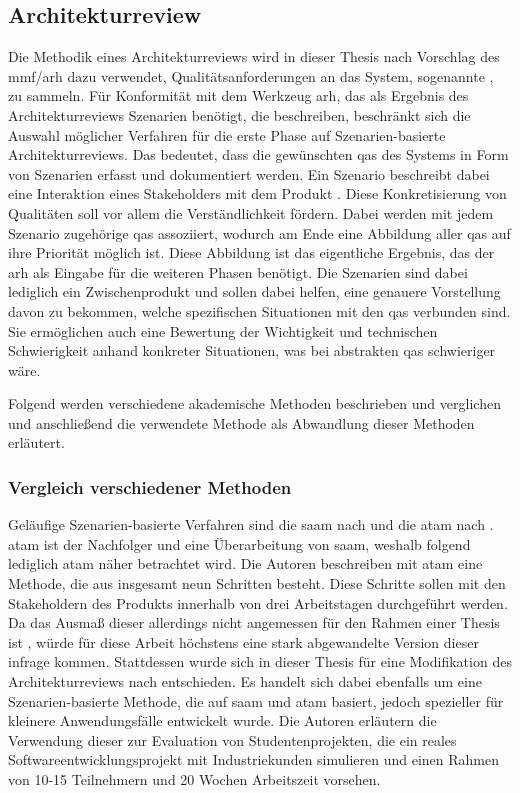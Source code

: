 \subsection{Architekturreview}
\label{sec:methodik-architekturreview}

Die Methodik eines Architekturreviews wird in dieser Thesis nach Vorschlag des \gls{mmf}/\gls{arh} dazu verwendet, Qualitätsanforderungen an das System, sogenannte , zu sammeln.
Für Konformität mit dem Werkzeug \gls{arh}, das als Ergebnis des Architekturreviews Szenarien benötigt, die  beschreiben, beschränkt sich die Auswahl möglicher Verfahren für die erste Phase auf Szenarien-basierte Architekturreviews.
Das bedeutet, dass die gewünschten \glspl{qa} des Systems in Form von Szenarien erfasst und dokumentiert werden.
Ein Szenario beschreibt dabei eine Interaktion eines Stakeholders mit dem Produkt \cite{kazman_2000}.
Diese Konkretisierung von Qualitäten soll vor allem die Verständlichkeit fördern.
Dabei werden mit jedem Szenario zugehörige \glspl{qa} assoziiert, wodurch am Ende eine Abbildung aller \glspl{qa} auf ihre Priorität möglich ist.
Diese Abbildung ist das eigentliche Ergebnis, das der \gls{arh} als Eingabe für die weiteren Phasen benötigt.
Die Szenarien sind dabei lediglich ein Zwischenprodukt und sollen dabei helfen, eine genauere Vorstellung davon zu bekommen, welche spezifischen Situationen mit den \glspl{qa} verbunden sind.
Sie ermöglichen auch eine Bewertung der Wichtigkeit und technischen Schwierigkeit anhand konkreter Situationen, was bei abstrakten \glspl{qa} schwieriger wäre.

Folgend werden verschiedene akademische Methoden beschrieben und verglichen und anschließend die verwendete Methode als Abwandlung dieser Methoden erläutert.

\subsubsection{Vergleich verschiedener Methoden}
\label{sec:atam-saam-svahnberg}

Geläufige Szenarien-basierte Verfahren sind die \gls{saam} nach  und die \gls{atam} nach .
\gls{atam} ist der Nachfolger und eine Überarbeitung von \gls{saam}, weshalb folgend lediglich \gls{atam} näher betrachtet wird.
Die Autoren beschreiben mit \gls{atam} eine Methode, die aus insgesamt neun Schritten besteht.
Diese Schritte sollen mit den Stakeholdern des Produkts innerhalb von drei Arbeitstagen durchgeführt werden.
Da das Ausmaß dieser allerdings nicht angemessen für den Rahmen einer Thesis ist \cite{master-marvin-knodel}, würde für diese Arbeit höchstens eine stark abgewandelte Version dieser infrage kommen.
Stattdessen wurde sich in dieser Thesis für eine Modifikation des Architekturreviews nach  entschieden.
Es handelt sich dabei ebenfalls um eine Szenarien-basierte Methode, die auf \gls{saam} und \gls{atam} basiert, jedoch spezieller für kleinere Anwendungsfälle entwickelt wurde.
Die Autoren erläutern die Verwendung dieser zur Evaluation von Studentenprojekten, die ein reales Softwareentwicklungsprojekt mit Industriekunden simulieren und einen Rahmen von 10-15 Teilnehmern und 20 Wochen Arbeitszeit vorsehen.

